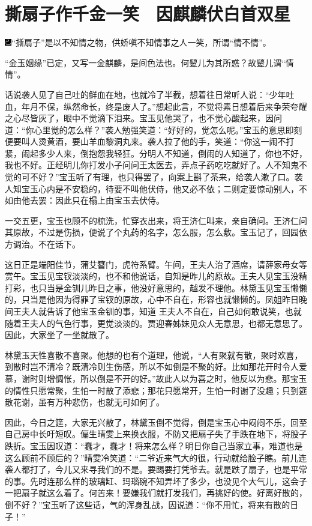 

\chapter{撕扇子作千金一笑　因麒麟伏白首双星}

{\includegraphics[width=3mm]{../Images/00003}``撕扇子''是以不知情之物，供娇嗔不知情事之人一笑，所谓``情不情''。}

{``金玉姻缘''已定，又写一金麒麟，是间色法也。何颦儿为其所惑？故颦儿谓``情情''。}

话说袭人见了自己吐的鲜血在地，也就冷了半截，想着往日常听人说：``少年吐血，年月不保，纵然命长，终是废人了。''想起此言，不觉将素日想着后来争荣夸耀之心尽皆灰了，眼中不觉滴下泪来。宝玉见他哭了，也不觉心酸起来，因问道：``你心里觉的怎么样？''袭人勉强笑道：``好好的，觉怎么呢。''宝玉的意思即刻便要叫人烫黄酒，要山羊血黎洞丸来。袭人拉了他的手，笑道：``你这一闹不打紧，闹起多少人来，倒抱怨我轻狂。分明人不知道，倒闹的人知道了，你也不好，我也不好。正经明儿你打发小子问问王太医去，弄点子药吃吃就好了。人不知鬼不觉的可不好？''宝玉听了有理，也只得罢了，向案上斟了茶来，给袭人漱了口。袭人知宝玉心内是不安稳的，待要不叫他伏侍，他又必不依；二则定要惊动别人，不如由他去罢：因此只在榻上由宝玉去伏侍。

一交五更，宝玉也顾不的梳洗，忙穿衣出来，将王济仁叫来，亲自确问。王济仁问其原故，不过是伤损，便说了个丸药的名字，怎么服，怎么敷。宝玉记了，回园依方调治。不在话下。

这日正是端阳佳节，蒲艾簪门，虎符系臂。午间，王夫人治了酒席，请薛家母女等赏午。宝玉见宝钗淡淡的，也不和他说话，自知是昨儿的原故。王夫人见宝玉没精打彩，也只当是金钏儿昨日之事，他没好意思的，越发不理他。林黛玉见宝玉懒懒的，只当是他因为得罪了宝钗的原故，心中不自在，形容也就懒懒的。凤姐昨日晚间王夫人就告诉了他宝玉金钏的事，知道
王夫人不自在，自己如何敢说笑，也就随着王夫人的气色行事，更觉淡淡的。贾迎春姊妹见众人无意思，也都无意思了。因此，大家坐了一坐就散了。

林黛玉天性喜散不喜聚。他想的也有个道理，他说，``人有聚就有散，聚时欢喜，到散时岂不清冷？既清冷则生伤感，所以不如倒是不聚的好。比如那花开时令人爱慕，谢时则增惆怅，所以倒是不开的好。''故此人以为喜之时，他反以为悲。那宝玉的情性只愿常聚，生怕一时散了添悲；那花只愿常开，生怕一时谢了没趣；只到筵散花谢，虽有万种悲伤，也就无可如何了。

因此，今日之筵，大家无兴散了，林黛玉倒不觉得，倒是宝玉心中闷闷不乐，回至自己房中长吁短叹。偏生晴雯上来换衣服，不防又把扇子失了手跌在地下，将股子跌折。宝玉因叹道：``蠢才，蠢才！将来怎么样？明日你自己当家立事，难道也是这么顾前不顾后的？''晴雯冷笑道：``二爷近来气大的很，行动就给脸子瞧。前儿连袭人都打了，今儿又来寻我们的不是。要踢要打凭爷去。就是跌了扇子，也是平常的事。先时连那么样的玻璃缸、玛瑙碗不知弄坏了多少，也没见个大气儿，这会子一把扇子就这么着了。何苦来！要嫌我们就打发我们，再挑好的使。好离好散的，倒不好？''宝玉听了这些话，气的浑身乱战，因说道：``你不用忙，将来有散的日子！''

